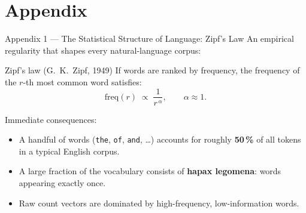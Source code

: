 \documentclass[aspectratio=169]{beamer}
\begin{document}
\section{Appendix}
%
%
%
\begin{frame}{Appendix 1 --- The Statistical Structure of Language: Zipf's Law}
An empirical regularity that shapes every natural-language corpus:
 
\vspace{0.12cm}
\begin{block}{Zipf's law (G.\ K.\ Zipf, 1949)}
If words are ranked by frequency, the frequency of the $r$-th most common word
satisfies:
\[
\mathrm{freq}(r) \;\propto\; \frac{1}{r^{\,\alpha}}, \qquad \alpha \approx 1.
\]
\end{block}
 
\vspace{0.12cm}
Immediate consequences:
\begin{itemize}
    \item A handful of words (\texttt{the}, \texttt{of}, \texttt{and}, \dots) accounts for
    roughly \textbf{50\,\%} of all tokens in a typical English corpus.
    \item A large fraction of the vocabulary consists of \textbf{hapax legomena}: words
    appearing exactly once.
    \item Raw count vectors are dominated by high-frequency, low-information words.
\end{itemize}
\end{frame}
%
%
\end{document}
